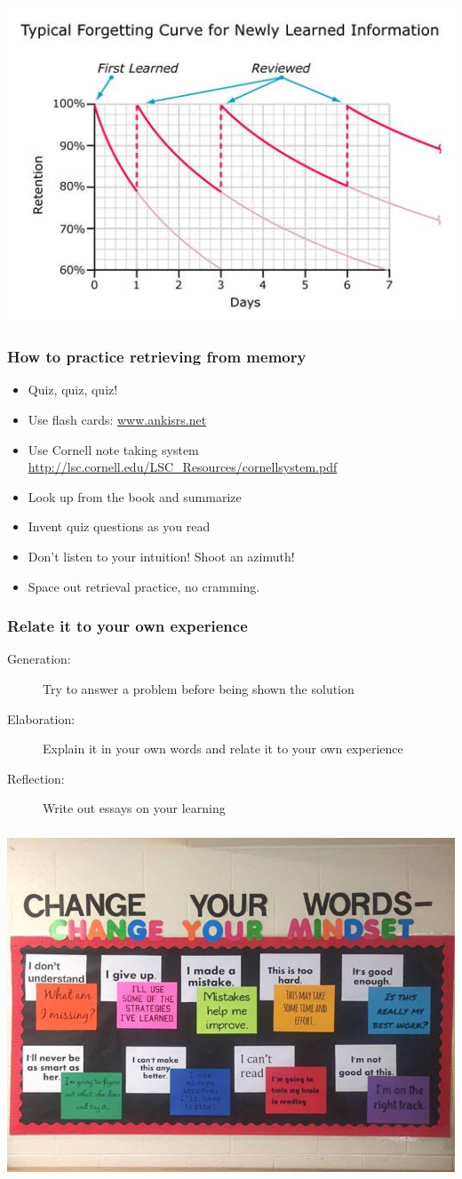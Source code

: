 \documentclass{beamer}
\newcommand{\bi}{\begin{itemize}}
\newcommand{\li}{\item}
\newcommand{\ei}{\end{itemize}}
\newcommand{\bfr}[1]{\begin{frame}[fragile]\frametitle{{ #1 }}}
\begin{document}
\bfr{}
\begin{center}
\includegraphics[width=\textwidth]{ForgettingCurve.jpg}
\end{center}
\end{frame}


\bfr{How to practice retrieving from memory}
\bi
\li Quiz, quiz, quiz!
\li Use flash cards: \url{www.ankisrs.net}
\li Use Cornell note taking system \\\url{http://lsc.cornell.edu/LSC_Resources/cornellsystem.pdf}
\li Look up from the book and summarize
\li Invent quiz questions as you read
\ei
\bi
\li Don't listen to your intuition!  Shoot an azimuth!
\li Space out retrieval practice, no cramming.
\ei
\end{frame}

\bfr{Relate it to your own experience}

\begin{description}
\item[Generation:]
  Try to answer a problem before being shown the solution
\item[Elaboration:]
  Explain it in your own words and relate it to your own experience
\item[Reflection:] Write out essays on your learning
\end{description}
\end{frame}


\bfr{}
\includegraphics[width=\textwidth]{changeyourvocabulary.jpg}
\end{frame}
\end{document}
